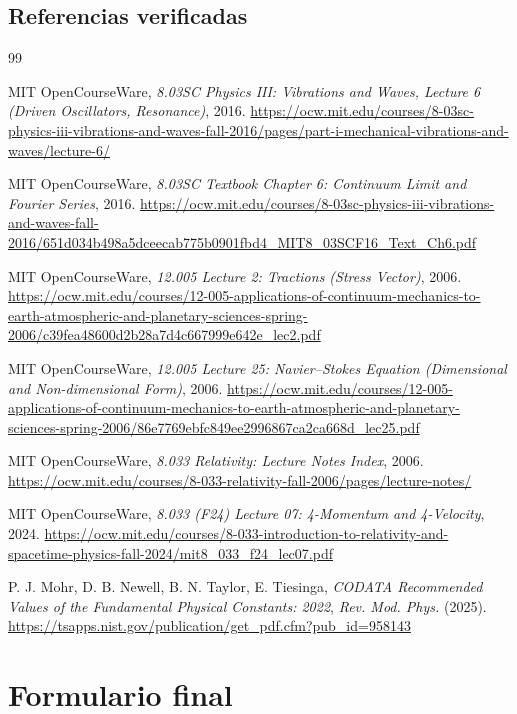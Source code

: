 \documentclass[12pt, a4paper]{article}
\theoremstyle{plain}
\theoremstyle{definition}
\theoremstyle{remark}
\begin{document}
\subsection*{Referencias verificadas}
{}
\begin{thebibliography}{99}

MIT OpenCourseWare, \emph{8.03SC Physics III: Vibrations and Waves, Lecture 6
(Driven Oscillators, Resonance)}, 2016.
\url{https://ocw.mit.edu/courses/8-03sc-physics-iii-vibrations-and-waves-fall-2016/pages/part-i-mechanical-vibrations-and-waves/lecture-6/}

MIT OpenCourseWare, \emph{8.03SC Textbook Chapter 6: Continuum Limit and Fourier Series},
2016.
\url{https://ocw.mit.edu/courses/8-03sc-physics-iii-vibrations-and-waves-fall-2016/651d034b498a5dceecab775b0901fbd4_MIT8_03SCF16_Text_Ch6.pdf}

MIT OpenCourseWare, \emph{12.005 Lecture 2: Tractions (Stress Vector)}, 2006.
\url{https://ocw.mit.edu/courses/12-005-applications-of-continuum-mechanics-to-earth-atmospheric-and-planetary-sciences-spring-2006/c39fea48600d2b28a7d4c667999e642e_lec2.pdf}

MIT OpenCourseWare, \emph{12.005 Lecture 25: Navier--Stokes Equation (Dimensional and
Non-dimensional Form)}, 2006.
\url{https://ocw.mit.edu/courses/12-005-applications-of-continuum-mechanics-to-earth-atmospheric-and-planetary-sciences-spring-2006/86e7769ebfc849ee2996867ca2ca668d_lec25.pdf}

MIT OpenCourseWare, \emph{8.033 Relativity: Lecture Notes Index}, 2006.
\url{https://ocw.mit.edu/courses/8-033-relativity-fall-2006/pages/lecture-notes/}

MIT OpenCourseWare, \emph{8.033 (F24) Lecture 07: 4-Momentum and 4-Velocity}, 2024.
\url{https://ocw.mit.edu/courses/8-033-introduction-to-relativity-and-spacetime-physics-fall-2024/mit8_033_f24_lec07.pdf}

P. J. Mohr, D. B. Newell, B. N. Taylor, E. Tiesinga,
\emph{CODATA Recommended Values of the Fundamental Physical Constants: 2022},
\emph{Rev. Mod. Phys.} (2025).
\url{https://tsapps.nist.gov/publication/get_pdf.cfm?pub_id=958143}

\end{thebibliography}

\clearpage
\section*{Formulario final}
{}
\end{document}
